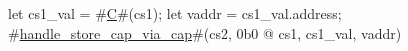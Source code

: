 let cs1_val = #\hyperref[sailRISCVzC]{C}#(cs1);
let vaddr = cs1_val.address;
#\hyperref[sailRISCVzhandlezystorezycapzyviazycap]{handle\_store\_cap\_via\_cap}#(cs2, 0b0 @ cs1, cs1_val, vaddr)
